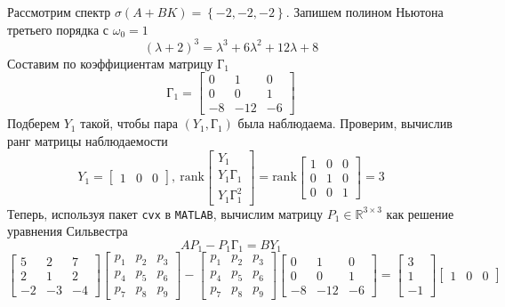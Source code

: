 \documentclass[a4paper, 12pt]{article}
\begin{document}
    Рассмотрим спектр $\sigma\left(A+BK\right)=\left\{-2,-2,-2\right\}$. Запишем полином
    Ньютона третьего порядка с $\omega_0=1$
    $$
    \left(\lambda+2\right)^3=\lambda^3+6\lambda^2+12\lambda+8
    $$
    Составим по коэффициентам матрицу $\text{Г}_1$
    $$
\text{Г}_1=\begin{bmatrix}
    0 &1 &0\\
    0 &0 &1\\
    -8 &-12 &-6
\end{bmatrix}
    $$
    Подберем $Y_1$ такой, чтобы пара $\left(Y_1,\text{Г}_1\right)$ была наблюдаема. Проверим, вычислив ранг
    матрицы наблюдаемости
    $$
    Y_1=\begin{bmatrix}
        1 &0 &0
    \end{bmatrix},\ \text{rank}\begin{bmatrix}
        Y_1\\ Y_1\text{Г}_1\\ Y_1\text{Г}_1^2
    \end{bmatrix}=\text{rank}\begin{bmatrix}
    1     &0     &0\\
     0     &1     &0\\
     0     &0     &1
    \end{bmatrix}=3
    $$
    Теперь, используя пакет \texttt{cvx} в \texttt{MATLAB}, вычислим матрицу $P_1\in\mathbb{R}^{3\times3}$
    как решение уравнения Сильвестра
    $$AP_1-P_1\text{Г}_1=BY_1$$
    $$\begin{bmatrix}
        5 &2 &7\\
        2 &1 &2\\
        -2 &-3 &-4
    \end{bmatrix}\begin{bmatrix}
        p_1 &p_2 &p_3\\
        p_4 &p_5 &p_6\\
        p_7 &p_8 &p_9
    \end{bmatrix}-\begin{bmatrix}
        p_1 &p_2 &p_3\\
        p_4 &p_5 &p_6\\
        p_7 &p_8 &p_9
    \end{bmatrix}\begin{bmatrix}
        0 &1 &0\\
        0 &0 &1\\
        -8 &-12 &-6
    \end{bmatrix}=\begin{bmatrix}
        3\\
        1\\
        -1
    \end{bmatrix}\begin{bmatrix}
        1 &0 &0
    \end{bmatrix}$$
\end{document}
